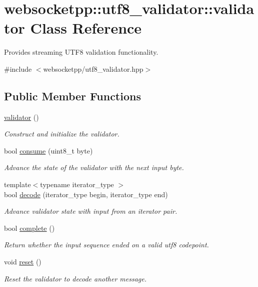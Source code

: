 \hypertarget{classwebsocketpp_1_1utf8__validator_1_1validator}{}\section{websocketpp\+:\+:utf8\+\_\+validator\+:\+:validator Class Reference}
\label{classwebsocketpp_1_1utf8__validator_1_1validator}


Provides streaming U\+T\+F8 validation functionality.  




{\ttfamily \#include $<$websocketpp/utf8\+\_\+validator.\+hpp$>$}

\subsection*{Public Member Functions}
\begin{DoxyCompactItemize}
\item 
\hyperlink{classwebsocketpp_1_1utf8__validator_1_1validator_a41ea90fb7c6b34d41a8e6e71a6b04346}{validator} ()
\begin{DoxyCompactList}\small\item\em Construct and initialize the validator. \end{DoxyCompactList}\item 
bool \hyperlink{classwebsocketpp_1_1utf8__validator_1_1validator_ada7f6cdd4261d848d51d7ba0bd9d28b4}{consume} (uint8\+\_\+t byte)
\begin{DoxyCompactList}\small\item\em Advance the state of the validator with the next input byte. \end{DoxyCompactList}\item 
{\footnotesize template$<$typename iterator\+\_\+type $>$ }\\bool \hyperlink{classwebsocketpp_1_1utf8__validator_1_1validator_a2cde6cad6f1a0f66674010848ec80fba}{decode} (iterator\+\_\+type begin, iterator\+\_\+type end)
\begin{DoxyCompactList}\small\item\em Advance validator state with input from an iterator pair. \end{DoxyCompactList}\item 
bool \hyperlink{classwebsocketpp_1_1utf8__validator_1_1validator_a89deb3bdfd8b94da908b806e543491ba}{complete} ()
\begin{DoxyCompactList}\small\item\em Return whether the input sequence ended on a valid utf8 codepoint. \end{DoxyCompactList}\item 
void \hyperlink{classwebsocketpp_1_1utf8__validator_1_1validator_a98aa3058213a650997bd832cc003da75}{reset} ()
\begin{DoxyCompactList}\small\item\em Reset the validator to decode another message. \end{DoxyCompactList}\end{DoxyCompactItemize}


